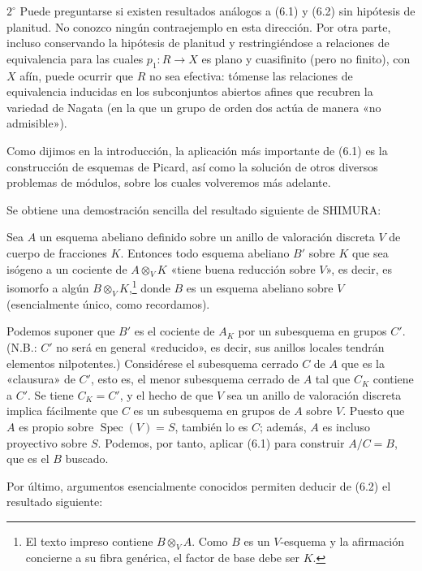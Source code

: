 \smallskip
\noindent $2^\circ$ Puede preguntarse si existen resultados análogos a (6.1)
y (6.2) sin hipótesis de planitud. No conozco ningún contraejemplo en esta
dirección. Por otra parte, incluso conservando la hipótesis de planitud y
restringiéndose a relaciones de equivalencia para las cuales $p_1:R\to X$ es
plano y cuasifinito (pero no finito), con $X$ afín, puede ocurrir que $R$ no
sea efectiva: tómense las relaciones de equivalencia inducidas en los
subconjuntos abiertos afines que recubren la variedad de Nagata (en la que un
grupo de orden dos actúa de manera «no admisible»).


Como dijimos en la introducción, la aplicación más importante de (6.1) es la
construcción de esquemas de Picard, así como la solución de otros diversos
problemas de módulos, sobre los cuales volveremos más adelante.

Se obtiene una demostración sencilla del resultado siguiente de SHIMURA:

 Sea $A$ un esquema abeliano definido sobre un
anillo de valoración discreta $V$ de cuerpo de fracciones $K$. Entonces todo
esquema abeliano $B'$ sobre $K$ que sea isógeno a un cociente de
$A\otimes_V K$ «tiene buena reducción sobre $V$», es decir, es isomorfo a
algún $B\otimes_V K$,\footnote{El texto impreso contiene $B\otimes_V A$.
Como $B$ es un $V$-esquema y la afirmación concierne a su fibra genérica, el
factor de base debe ser $K$.} donde $B$ es un esquema abeliano sobre $V$
(esencialmente único, como recordamos).

Podemos suponer que $B'$ es el cociente de $A_K$ por un subesquema en grupos
$C'$. (N.B.: $C'$ no será en general «reducido», es decir, sus anillos locales
tendrán elementos nilpotentes.) Considérese el subesquema cerrado $C$ de $A$
que es la «clausura» de $C'$, esto es, el menor subesquema cerrado de $A$ tal
que $C_K$ contiene a $C'$. Se tiene $C_K=C'$, y el hecho de que $V$ sea un
anillo de valoración discreta implica fácilmente que $C$ es un subesquema en
grupos de $A$ sobre $V$. Puesto que $A$ es propio sobre
$\operatorname{Spec}(V)=S$, también lo es $C$; además, $A$ es incluso
proyectivo sobre $S$. Podemos, por tanto, aplicar (6.1) para construir
$A/C=B$,
que es el $B$ buscado.

Por último, argumentos esencialmente conocidos permiten deducir de (6.2) el
resultado siguiente:

